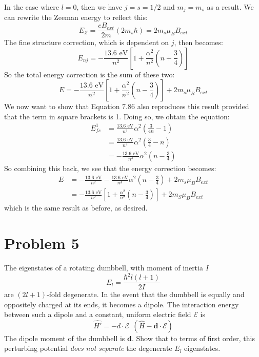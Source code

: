 \documentclass[10pt]{article}
\begin{document}
		\begin{solution}
			In the case where $l = 0$, then we have $j = s = 1/2$ and $m_j = m_s$ as a result. We can rewrite the Zeeman energy to reflect this: 
			\[ E_Z = \frac{eB_{ext}}{2m} (2 m_s \hbar) = 2m_s \mu_B B_{ext}\]
			The fine structure correction, which is dependent on $j$, then becomes: 
			\[ E_{nj} = -\frac{13.6 \text{ eV}}{n^2}\left[1 + \frac{\alpha^2}{n^2}\left( n + \frac 34\right) \right]\]
			So the total energy correction is the sum of these two: 
			\[ E = -\frac{13.6\text{ eV}}{n^2}\left[1 + \frac{\alpha^2}{n^2}\left(n - \frac 34\right) \right] + 2m_s \mu_B B_{ext}\]
			We now want to show that Equation 7.86 also reproduces this result provided that the term in square brackets is 1. Doing so, we obtain the equation: 
			\begin{align*}
				E_{fs}^1 &= \frac{13.6 \text{ eV}}{n^3}\alpha^2\left( \frac{3}{4n} - 1\right)\\
				&= \frac{13.6 \text{ eV}}{n^4} \alpha^2 \left( \frac 34 - n\right) \\
				&= -\frac{13.6 \text{ eV}}{n^4} \alpha^2 \left( n - \frac 34\right)
			\end{align*}
			So combining this back, we see that the energy correction becomes: 
			\begin{align*}
				E &= -\frac{13.6 \text{ eV}}{n^2} - \frac{13.6 \text{ eV}}{n^4} \alpha^2 \left( n - \frac 34\right) + 2m_s \mu_B B_{ext}\\
				&=-\frac{13.6 \text{ eV}}{n^2}\left[1 + \frac{\alpha^2}{n^2}\left( n - \frac 34\right) \right] + 2m_S \mu_B B_{ext}
			\end{align*}
			which is the same result as before, as desired.
		\end{solution}

		\pagebreak

		\section*{Problem 5}
		The eigenstates of a rotating dumbbell, with moment of inertia $I$\[
		E_l = \frac{\hbar^2 l(l+1)}{2I}
		\] are $(2l + 1)$-fold degenerate. In the event that the dumbbell is equally and oppositely
		charged at its ends, it becomes a dipole. The interaction energy between such a dipole and 
		a constant, uniform electric field $\mathscr E$ is \[
				\hat{H'} = -d \cdot \mathscr E \ \ (\hat{H} - \mathbf d \cdot \mathscr E)
		\] The dipole moment of the dumbbell is $\mathbf d$. Show that to terms of first order, this
		perturbing potential \textit{does not separate} the degenerate $E_l$ eigenstates.
\end{document}
